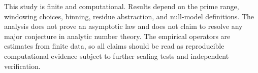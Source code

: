 This study is finite and computational. Results depend on the prime range, windowing choices, binning, residue abstraction, and null-model definitions. The analysis does not prove an asymptotic law and does not claim to resolve any major conjecture in analytic number theory. The empirical operators are estimates from finite data, so all claims should be read as reproducible computational evidence subject to further scaling tests and independent verification.
